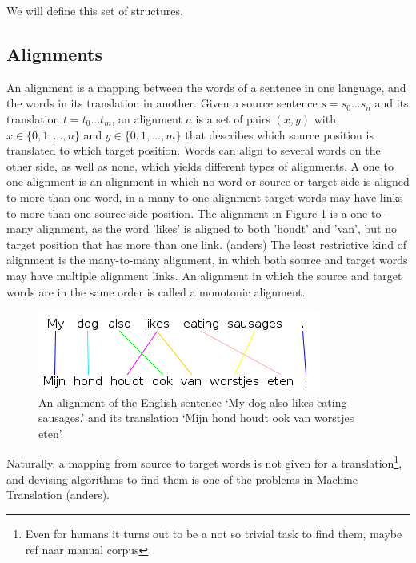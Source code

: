 \documentclass{report}
\theoremstyle{indented}
\begin{document}
We will define this set of structures.

\subsection{Alignments}

An alignment is a mapping between the words of a sentence in one language, and the words in its translation in another. Given a source sentence $s = s_0 \ldots s_n$ and its translation $t = t_0 \ldots t_m$, an alignment $a$ is a set of pairs $(x,y)$ with $x\in \{0,1,\ldots,n\}$ and $y\in \{0,1,\ldots,m\}$ that describes which source position is translated to which target position. Words can align to several words on the other side, as well as none, which yields different types of alignments. A one to one alignment is an alignment in which no word or source or target side is aligned to more than one word, in a many-to-one alignment target words may have links to more than one source side position. The alignment in Figure \ref{fig:alignment} is a one-to-many alignment, as the word 'likes' is aligned to both 'houdt' and 'van', but no target position that has more than one link. (anders) The least restrictive kind of alignment is the many-to-many alignment, in which both source and target words may have multiple alignment links. An alignment in which the source and target words are in the same order is called a monotonic alignment.

\begin{figure}[!ht]
\centering
\includegraphics[scale=0.6]{alignment.png}
\caption{An alignment of the English sentence `My dog also likes eating sausages.' and its translation `Mijn hond houdt ook van worstjes eten'.%
}\label{fig:alignment}
\end{figure}

Naturally, a mapping from source to target words is not given for a translation\footnote{Even for humans it turns out to be a not so trivial task to find them, maybe ref naar manual corpus}, and devising algorithms to find them is one of the problems in Machine Translation (anders).
\end{document}
